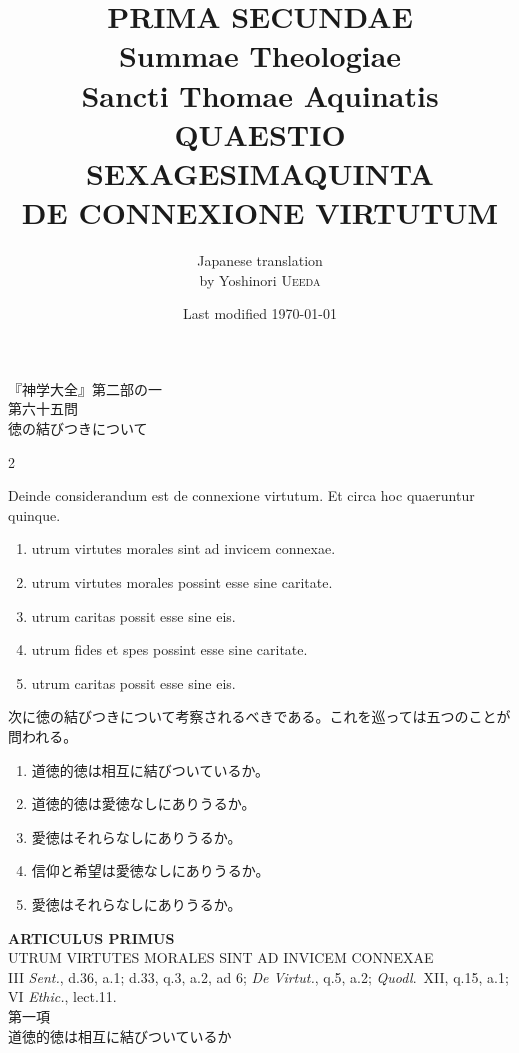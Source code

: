 \documentclass[paper=a4paper,fontsize=10pt,jafontsize=9pt,titlepage]{jlreq}
\title{{\bfseries PRIMA SECUNDAE}\\{\Huge Summae Theologiae}\\Sancti Thomae
Aquinatis\\{\sffamily QUAESTIO SEXAGESIMAQUINTA}\\DE CONNEXIONE VIRTUTUM}
\author{Japanese translation\\by Yoshinori {\scshape Ueeda}}
\date{Last modified \today}
\begin{document}
\maketitle
\thispagestyle{empty}

\begin{center}
{\LARGE 『神学大全』第二部の一}\\
{\Large 第六十五問\\徳の結びつきについて}
\end{center}

\begin{paracol}{2}

Deinde considerandum est de connexione virtutum. Et circa hoc
quaeruntur quinque. 

\begin{enumerate}
 \item utrum virtutes morales sint ad invicem connexae.
 \item utrum virtutes morales possint esse sine caritate.
 \item utrum caritas possit esse sine eis.
 \item utrum fides et spes possint esse sine caritate.
 \item utrum caritas possit esse sine eis.
\end{enumerate}

\switchcolumn

次に徳の結びつきについて考察されるべきである。これを巡っては五つのことが問われる。

\begin{enumerate}
 \item 道徳的徳は相互に結びついているか。
 \item 道徳的徳は愛徳なしにありうるか。
 \item 愛徳はそれらなしにありうるか。
 \item 信仰と希望は愛徳なしにありうるか。
 \item 愛徳はそれらなしにありうるか。
\end{enumerate}

\end{paracol}

\newpage
{}
{}
\setcounter{section}{1}
\setcounter{subsection}{0}




\begin{center}
{\Large {\bfseries ARTICULUS PRIMUS}}\\
{\large UTRUM VIRTUTES MORALES SINT AD INVICEM CONNEXAE}\\
 {\footnotesize III {\itshape Sent.}, d.36, a.1; d.33, q.3, a.2, ad 6; {\itshape De Virtut.}, q.5, a.2; {\itshape Quodl}.~XII, q.15, a.1; VI {\itshape Ethic.}, lect.11.}\\
{\Large 第一項\\道徳的徳は相互に結びついているか}
\end{center}
\end{document}
